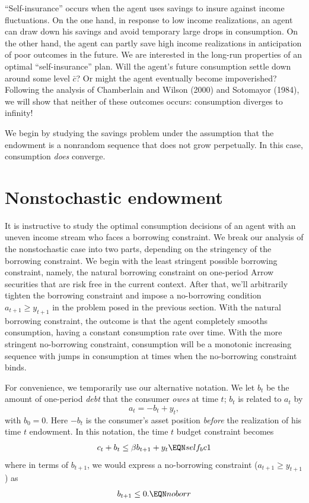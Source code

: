 ``Self-insurance'' occurs when the agent uses savings to insure
 against income fluctuations. On the one hand, in response
to low income realizations, an agent can draw down his savings and
avoid temporary large drops in consumption. On the other hand, the
agent can partly save high income realizations in anticipation of
poor outcomes in the future. We are interested in the long-run
properties of an optimal ``self-insurance'' plan. Will the
agent's future consumption settle down around some level $\bar
c$?  Or might the agent eventually become
 impoverished? Following
the analysis of Chamberlain and Wilson (2000) and Sotomayor (1984),
we will show that neither of these outcomes occurs: consumption  diverges
to infinity! 

We begin by studying the savings
problem under the assumption that the endowment is  a nonrandom sequence  that
does not grow perpetually.  In this case,  consumption {\it does\/} converge.

\section{Nonstochastic endowment}

It is instructive to study the optimal consumption decisions
of an agent with an uneven income stream who faces a borrowing constraint.
We break our analysis of the nonstochastic case into two parts,
depending on the stringency of the borrowing constraint.  We begin with
the least stringent possible borrowing constraint, namely, the natural
borrowing constraint on one-period Arrow securities that  are
risk free in the current context.  After that, we'll arbitrarily
tighten  the borrowing constraint and impose a no-borrowing
condition $a_{t+1} \geq y_{t+1}$ in the problem posed in the previous section.
With the natural borrowing constraint, the outcome is that the agent completely
smooths consumption, having a constant consumption rate over time.  With the more
stringent no-borrowing constraint,  consumption
will be a monotonic increasing sequence with jumps in consumption at times when the no-borrowing constraint binds.

  For convenience, we temporarily use our alternative notation.  We
let $b_t$ be the   amount of one-period {\it debt\/} that
the consumer {\it owes\/} at time $t$;
$b_t$ is related to $a_t$ by
$$ a_t = - b_t + y_t ,$$
with $b_0 = 0$.
Here $-b_t$ is the consumer's asset position {\it before\/} the realization
of his  time $t$ endowment.
In this notation, the time $t$ budget constraint
  becomes
$$ c_t + b_t \leq \beta b_{t+1} + y_t \EQN self_bc1 $$
where in terms of $b_{t+1}$, we would express
a no-borrowing constraint ($a_{t+1}  \geq y_{t+1}$)
as $$b_{t+1} \leq 0. \EQN noborr $$

